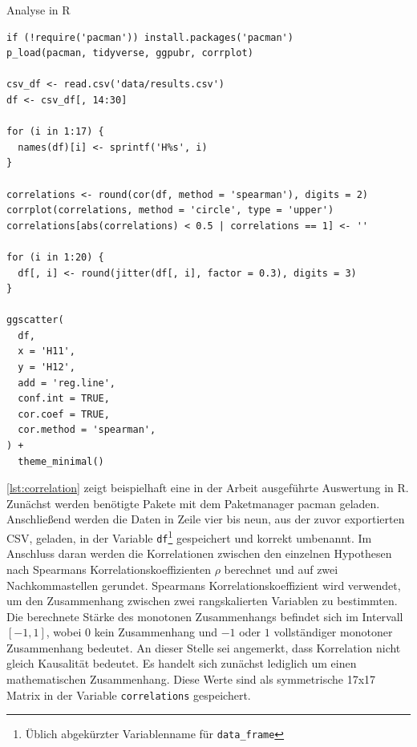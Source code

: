 \begin{listing}[H]
\caption{Analyse in R}
\label{lst:correlation}
\begin{verbatim}
if (!require('pacman')) install.packages('pacman')
p_load(pacman, tidyverse, ggpubr, corrplot)

csv_df <- read.csv('data/results.csv')
df <- csv_df[, 14:30]

for (i in 1:17) {
  names(df)[i] <- sprintf('H%s', i)
}

correlations <- round(cor(df, method = 'spearman'), digits = 2)
corrplot(correlations, method = 'circle', type = 'upper')
correlations[abs(correlations) < 0.5 | correlations == 1] <- ''

for (i in 1:20) {
  df[, i] <- round(jitter(df[, i], factor = 0.3), digits = 3)
}

ggscatter(
  df,
  x = 'H11',
  y = 'H12',
  add = 'reg.line',
  conf.int = TRUE,
  cor.coef = TRUE,
  cor.method = 'spearman',
) +
  theme_minimal()
\end{verbatim}
\end{listing}

\autoref{lst:correlation} zeigt beispielhaft eine in der Arbeit ausgeführte Auswertung in R.
Zunächst werden benötigte Pakete mit dem Paketmanager pacman\cite{rdoc-pacman} geladen. Anschließend werden die Daten in Zeile vier bis neun, aus der zuvor exportierten \ac{CSV}, geladen, in der Variable \texttt{df}\footnote{Üblich abgekürzter Variablenname für \texttt{data\_frame}} gespeichert und korrekt umbenannt. Im Anschluss daran werden die Korrelationen zwischen den einzelnen Hypothesen nach Spearmans Korrelationskoeffizienten $\rho$ berechnet und auf zwei Nachkommastellen gerundet. Spearmans Korrelationskoeffizient wird verwendet, um den Zusammenhang zwischen zwei rangskalierten Variablen zu bestimmten\cite{statistik-datenanalyse}. Die berechnete Stärke des monotonen Zusammenhangs befindet sich im Intervall $[-1, 1]$, wobei $0$ kein Zusammenhang und $-1$ oder $1$ vollständiger monotoner Zusammenhang bedeutet. An dieser Stelle sei angemerkt, dass Korrelation nicht gleich Kausalität bedeutet\cite[S.64]{elementare-stochastik}. Es handelt sich zunächst lediglich um einen mathematischen Zusammenhang. Diese Werte sind als symmetrische 17x17 Matrix in der Variable \texttt{correlations} gespeichert. \\


